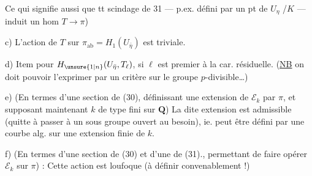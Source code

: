 Ce qui signifie aussi que tt  scindage
de 31 --- p.ex. défini par un pt de $U_\eta$
/$K$ --- induit un hom $T\longrightarrow\pi$)

\noindent c) L'action de $T$ sur $\pi_{\mathrm{ab}}=H_1(U_{\bar\eta})$ est
triviale.

\noindent d) Item pour $H_{\unsure{1|n}}(U_{\bar\eta},T_\ell)$, si $\ell$ est premier
à la car. résiduelle. (\uline{NB}  \unsure{,|)}
on doit pouvoir l'exprimer par un critère
sur le groupe $p$-divisible\ldots)

\noindent e) (En termes d'une section de (30),
définissant une extension de $\mathcal E_k$ par $\pi$,
et supposant maintenant $k$ de type
fini sur $\mathbf Q$) La dite extension est
admissible (quitte à passer à un
sous groupe ouvert  au besoin), ie.
peut être défini par une courbe alg.
sur  une extension finie de $k$.

\noindent f) (En termes d'une section de (30)
et d'une de (31)., permettant de
faire opérer $\mathcal E_k$ sur $\pi$) : Cette
action est  loufoque (à définir convenablement !)%
